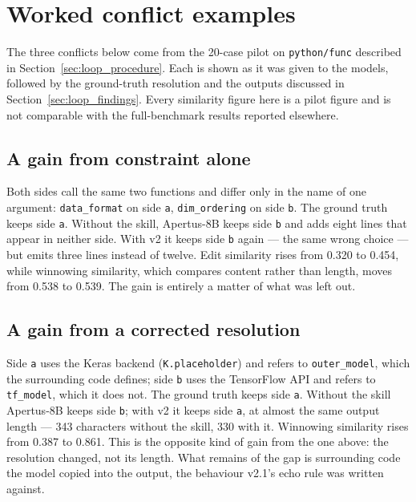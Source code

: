 %
%

\section{Worked conflict examples}
\label{app:cases}

The three conflicts below come from the 20-case pilot on \texttt{python/func}
described in Section~\ref{sec:loop_procedure}. Each is shown as it was given to
the models, followed by the ground-truth resolution and the outputs discussed in
Section~\ref{sec:loop_findings}. Every similarity figure here is a pilot figure
and is not comparable with the full-benchmark results reported elsewhere.

\subsection{A gain from constraint alone}

Both sides call the same two functions and differ only in the name of one
argument: \texttt{data\_format} on side \texttt{a}, \texttt{dim\_ordering} on side
\texttt{b}. The ground truth keeps side \texttt{a}. Without the skill, Apertus-8B
keeps side \texttt{b} and adds eight lines that appear in neither side. With v2 it
keeps side \texttt{b} again --- the same wrong choice --- but emits three lines
instead of twelve. Edit similarity rises from 0.320 to 0.454, while winnowing
similarity, which compares content rather than length, moves from 0.538 to 0.539.
The gain is entirely a matter of what was left out.



\subsection{A gain from a corrected resolution}

Side \texttt{a} uses the Keras backend (\texttt{K.placeholder}) and refers to
\texttt{outer\_model}, which the surrounding code defines; side \texttt{b} uses the
TensorFlow API and refers to \texttt{tf\_model}, which it does not. The ground
truth keeps side \texttt{a}. Without the skill Apertus-8B keeps side \texttt{b};
with v2 it keeps side \texttt{a}, at almost the same output length --- 343
characters without the skill, 330 with it. Winnowing similarity rises from 0.387
to 0.861. This is the opposite kind of gain from the one above: the resolution
changed, not its length. What remains of the gap is surrounding code the model
copied into the output, the behaviour v2.1's echo rule was written against.

